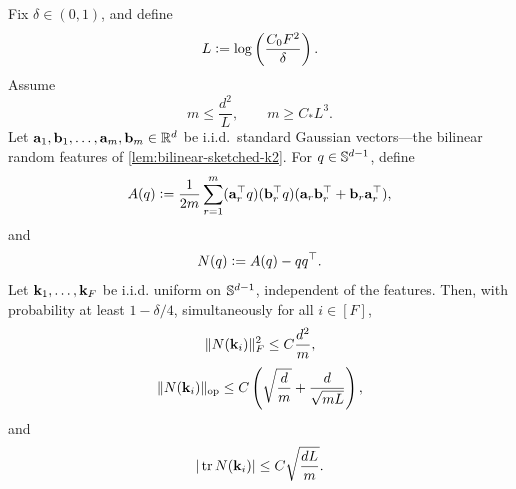 \begin{lemma}
\label{lem:bilinear-column-matrix-regularity}
Fix \(\delta\in(0,1)\), and define
\[
L\vcentcolon= \log\left(\frac{C_0F^2}{\delta}\right).
\]
Assume
\[
m\le \frac{d^2}{L},
\qquad
m\ge C_*L^3.
\]
Let \({\mathbf{a}}_1,{\mathbf{b}}_1,\dots,{\mathbf{a}}_m,{\mathbf{b}}_m\in\mathbb{R}^d\) be i.i.d.\ standard Gaussian
vectors---the bilinear random features of \cref{lem:bilinear-sketched-k2}.
For \(q\in\mathbb{S}^{d-1}\), define
\[
A(q)
\vcentcolon=
\frac1{2m}\sum_{r=1}^m
({\mathbf{a}}_r^\top q)({\mathbf{b}}_r^\top q)({\mathbf{a}}_r{\mathbf{b}}_r^\top+{\mathbf{b}}_r{\mathbf{a}}_r^\top),
\]
and
\[
N(q)\vcentcolon= A(q)-qq^\top.
\]
Let \({\mathbf{k}}_1,\dots,{\mathbf{k}}_F\) be i.i.d. uniform on \(\mathbb{S}^{d-1}\), independent of the
features. Then, with probability at least \(1-\delta/4\), simultaneously for all
\(i\in[F]\),
\[
\|N({\mathbf{k}}_i)\|_F^2\le C\frac{d^2}{m},
\]
\[
\|N({\mathbf{k}}_i)\|_{\mathrm{op}}
\le
C\left(\sqrt{\frac dm}+\frac{d}{\sqrt{mL}}\right),
\]
and
\[
|\operatorname{tr}N({\mathbf{k}}_i)|
\le
C\sqrt{\frac{dL}{m}}.
\]
\end{lemma}

